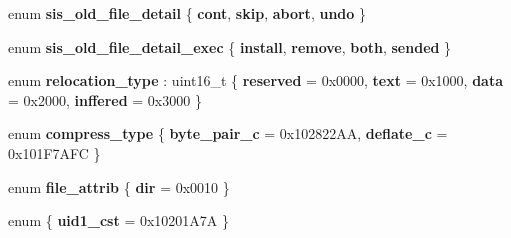 \begin{DoxyCompactItemize}
enum {\bfseries sis\+\_\+old\+\_\+file\+\_\+detail} \{ {\bfseries cont}, 
{\bfseries skip}, 
{\bfseries abort}, 
{\bfseries undo}
 \}
\item 
\mbox{\label{namespaceeka2l1_1_1loader_ae743ce372f77f80accf5e4971bcffeb4}} 
enum {\bfseries sis\+\_\+old\+\_\+file\+\_\+detail\+\_\+exec} \{ {\bfseries install}, 
{\bfseries remove}, 
{\bfseries both}, 
{\bfseries sended}
 \}
\item 
\mbox{\label{namespaceeka2l1_1_1loader_a659185a830acf57261f07e0640b35244}} 
enum {\bfseries relocation\+\_\+type} \+: uint16\+\_\+t \{ {\bfseries reserved} = 0x0000, 
{\bfseries text} = 0x1000, 
{\bfseries data} = 0x2000, 
{\bfseries inffered} = 0x3000
 \}
\item 
\mbox{\label{namespaceeka2l1_1_1loader_ad4f57a4721c5eec9a574b2a785aad135}} 
enum {\bfseries compress\+\_\+type} \{ {\bfseries byte\+\_\+pair\+\_\+c} = 0x102822\+AA, 
{\bfseries deflate\+\_\+c} = 0x101\+F7\+A\+FC
 \}
\item 
\mbox{\label{namespaceeka2l1_1_1loader_ad013155ae361d5321356227c270668bb}} 
enum {\bfseries file\+\_\+attrib} \{ {\bfseries dir} = 0x0010
 \}
\item 
\mbox{\label{namespaceeka2l1_1_1loader_aa90abe593a2560aa7f6df29b075f99ee}} 
enum \{ {\bfseries uid1\+\_\+cst} = 0x10201\+A7A
 \}
\end{DoxyCompactItemize}
